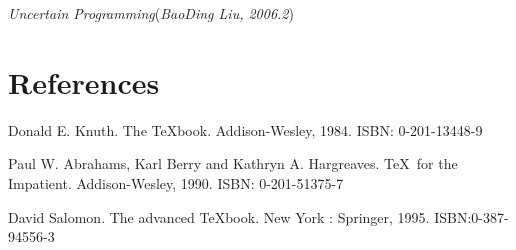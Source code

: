 \hfill\textit{Uncertain Programming\/}\quad(\textsl{BaoDing Liu, 2006.2})

\section*{References}

\begin{translationbib}
	\item Donald E. Knuth. The \TeX book. Addison-Wesley, 1984. ISBN: 0-201-13448-9
	\item Paul W. Abrahams, Karl Berry and Kathryn A. Hargreaves. \TeX\ for the
	Impatient. Addison-Wesley, 1990. ISBN: 0-201-51375-7
	\item David Salomon. The advanced \TeX book.  New York : Springer, 1995. ISBN:0-387-94556-3
\end{translationbib}
